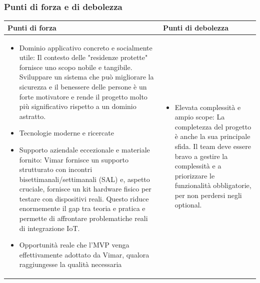 \documentclass[a4paper,11pt]{article}
\begin{document}
\subsubsection{Punti di forza e di debolezza}
{\footnotesize
\begin{tabularx}{\textwidth}{|X|X|}
\hline
\rowcolor{lightgray!40} %
\textbf{Punti di forza} & \textbf{Punti di debolezza} \\
\hline
\begin{itemize}
\item Dominio applicativo concreto e socialmente utile: Il contesto delle "residenze protette" fornisce uno scopo nobile e tangibile. Sviluppare un sistema che può migliorare la sicurezza e il benessere delle persone è un forte motivatore e rende il progetto molto più significativo rispetto a un dominio astratto.
\item Tecnologie moderne e ricercate
\item Supporto aziendale eccezionale e materiale fornito: Vimar fornisce un supporto strutturato con incontri bisettimanali/settimanali (SAL) e, aspetto cruciale, fornisce un kit hardware fisico per testare con dispositivi reali. Questo riduce enormemente il gap tra teoria e pratica e permette di affrontare problematiche reali di integrazione IoT.
\item Opportunità reale che l'MVP venga effettivamente adottato da Vimar, qualora raggiungesse la qualità necessaria
\end{itemize}
 & \begin{itemize}
\item Elevata complessità e ampio scope: La completezza del progetto è anche la sua principale sfida. Il team deve essere bravo a gestire la complessità e a priorizzare le funzionalità obbligatorie, per non perdersi negli optional.
\end{itemize} \\
\hline
\end{tabularx}
}
\end{document}
